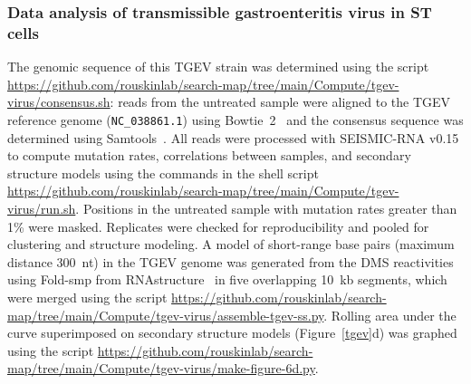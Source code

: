 \documentclass[main.tex]{subfiles}
\begin{document}
\subsubsection{Data analysis of transmissible gastroenteritis virus in ST cells}

The genomic sequence of this TGEV strain was determined using the script \url{https://github.com/rouskinlab/search-map/tree/main/Compute/tgev-virus/consensus.sh}: reads from the untreated sample were aligned to the TGEV reference genome (\verb|NC_038861.1|) using Bowtie~2~\cite{Langmead2012} and the consensus sequence was determined using Samtools~\cite{Li2009}.
All reads were processed with SEISMIC-RNA v0.15 to compute mutation rates, correlations between samples, and secondary structure models using the commands in the shell script \url{https://github.com/rouskinlab/search-map/tree/main/Compute/tgev-virus/run.sh}.
Positions in the untreated sample with mutation rates greater than 1\% were masked.
Replicates were checked for reproducibility and pooled for clustering and structure modeling.
A model of short-range base pairs (maximum distance 300~nt) in the TGEV genome was generated from the DMS reactivities using Fold-smp from RNAstructure~\cite{Reuter2010} in five overlapping 10~kb segments, which were merged using the script \url{https://github.com/rouskinlab/search-map/tree/main/Compute/tgev-virus/assemble-tgev-ss.py}.
Rolling area under the curve superimposed on secondary structure models (Figure~\ref{tgev}d) was graphed using the script \url{https://github.com/rouskinlab/search-map/tree/main/Compute/tgev-virus/make-figure-6d.py}.
\end{document}

